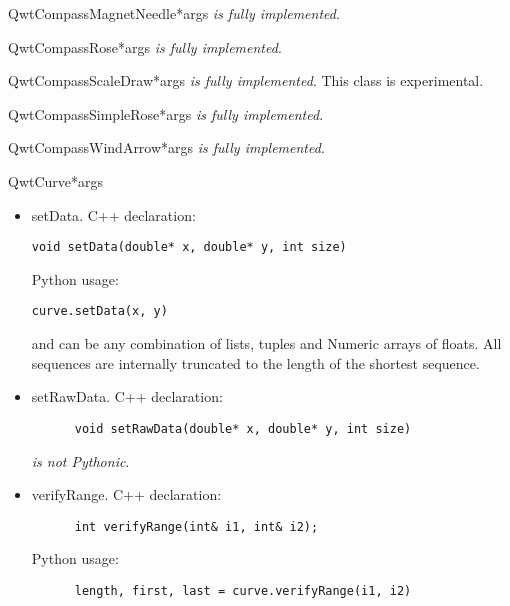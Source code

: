 \documentclass{manual}
\begin{document}
\begin{classdesc}{QwtCompassMagnetNeedle}{*args}
\emph{is fully implemented}.
\end{classdesc}

\begin{classdesc}{QwtCompassRose}{*args}
\emph{is fully implemented}.
\end{classdesc}

\begin{classdesc}{QwtCompassScaleDraw}{*args}
\emph{is fully implemented}. This class is experimental.
\end{classdesc}

\begin{classdesc}{QwtCompassSimpleRose}{*args}
\emph{is fully implemented}.
\end{classdesc}

\begin{classdesc}{QwtCompassWindArrow}{*args}
\emph{is fully implemented}.
\end{classdesc}

\begin{classdesc}{QwtCurve}{*args}

  \begin{itemize}

    \item{setData}. C++ declaration:
      \begin{verbatim}
void setData(double* x, double* y, int size)
      \end{verbatim}
      Python usage:
      \begin{verbatim}
curve.setData(x, y)
      \end{verbatim}
       and  can be any combination of lists, tuples and Numeric
      arrays of floats.
      All sequences are internally truncated to the length of the shortest
      sequence.

    \item{setRawData}. C++ declaration:
      \begin{verbatim}
      void setRawData(double* x, double* y, int size)
      \end{verbatim}
       \emph{is not Pythonic}.

    \item{verifyRange}. C++ declaration:
      \begin{verbatim}
      int verifyRange(int& i1, int& i2);
      \end{verbatim}
      Python usage:
      \begin{verbatim}
      length, first, last = curve.verifyRange(i1, i2)
      \end{verbatim}

  \end{itemize}
\end{classdesc}
\end{document}
